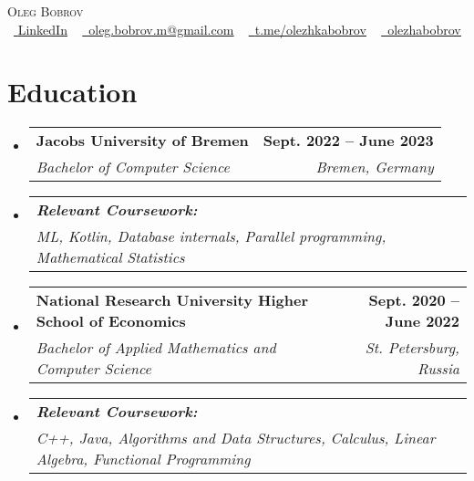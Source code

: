 \documentclass[letterpaper,11pt]{article}
\makeatletter
\newcommand{\resumeSubheading}[4]{
  \vspace{-2pt}\item
    \begin{tabular*}{1.0\textwidth}[t]{l@{\extracolsep{\fill}}r}
      #1 & \textbf{\large #2} \\
      \textit{\large#3} & \textit{\large #4} \\
    \end{tabular*}\vspace{-7pt}
}
\newcommand{\resumeSubHeadingListStart}{\begin{itemize}[leftmargin=0.0in, label={}]}
\newcommand{\resumeSubHeadingListEnd}{\end{itemize}}
\makeatother
\begin{document}

\begin{center}
    {\Huge \scshape Oleg Bobrov} \\ \vspace{1pt}
    \small \raisebox{-0.1\height}\faLinkedin\ \href{https://www.linkedin.com/in/oleg-bobrov-77a578210/}{  \underline{LinkedIn}} ~ \href{mailto:oleg.bobrov.m@gmail.com}{\raisebox{-0.2\height}\faEnvelope\  \underline{oleg.bobrov.m@gmail.com}} ~ 
    \href{https://t.me/olezhkabobrov//}{\raisebox{-0.2\height}\faTelegram\ \underline{t.me/olezhkabobrov}}  ~
    \href{https://github.com/olezhabobrov}{\raisebox{-0.2\height}\faGithub\ \underline{olezhabobrov}}
    \vspace{-8pt}
\end{center}


\section{Education}
  \resumeSubHeadingListStart
      \resumeSubheading
          {\textbf{\large{Jacobs University of Bremen}}}{Sept. 2022 -- June 2023 }
          {\large{Bachelor of Computer Science}}{Bremen, Germany}
        \resumeSubheading
            {\quad \textbf{\textit{Relevant Coursework:}}}{}
            {\quad ML, Kotlin, Database internals, Parallel programming, Mathematical Statistics}{}
    \resumeSubheading
      {\textbf{\large{National Research University Higher School of Economics}}}{Sept. 2020 -- June 2022 }
      {\large{Bachelor of Applied Mathematics and Computer Science}}{St. Petersburg, Russia}
    \resumeSubheading
        {\quad \textbf{\textit{Relevant Coursework:}}}{}
        {\quad C++, Java, Algorithms and Data Structures,  Calculus, Linear Algebra, Functional Programming}{}
  \resumeSubHeadingListEnd

 
\end{document}
